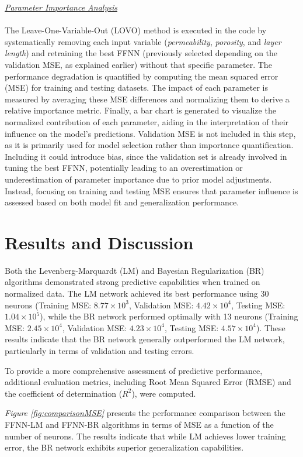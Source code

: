 \documentclass[10pt]{article}
\begin{document}
		\underline{\textit{Parameter Importance Analysis}} \\
		\\
		The Leave-One-Variable-Out (LOVO) method is executed in the code by systematically removing each input variable (\textit{permeability}, \textit{porosity}, and \textit{layer length}) and retraining the best FFNN (previously selected depending on the validation MSE, as explained earlier) without that specific parameter. The performance degradation is quantified by computing the mean squared error (MSE) for training and testing datasets. The impact of each parameter is measured by averaging these MSE differences and normalizing them to derive a relative importance metric. Finally, a bar chart is generated to visualize the normalized contribution of each parameter, aiding in the interpretation of their influence on the model's predictions. Validation MSE is not included in this step, as it is primarily used for model selection rather than importance quantification. Including it could introduce bias, since the validation set is already involved in tuning the best FFNN, potentially leading to an overestimation or underestimation of parameter importance due to prior model adjustments. Instead, focusing on training and testing MSE ensures that parameter influence is assessed based on both model fit and generalization performance.
	
	\section{Results and Discussion}
	
	Both the Levenberg-Marquardt (LM) and Bayesian Regularization (BR) algorithms demonstrated strong predictive capabilities when trained on normalized data. The LM network achieved its best performance using 30 neurons (Training MSE: \(8.77 \times 10^3\), Validation MSE: \(4.42 \times 10^4\), Testing MSE: \(1.04 \times 10^5\)), while the BR network performed optimally with 13 neurons (Training MSE: \(2.45 \times 10^4\), Validation MSE: \(4.23 \times 10^4\), Testing MSE: \(4.57 \times 10^4\)). These results indicate that the BR network generally outperformed the LM network, particularly in terms of validation and testing errors.
	
	To provide a more comprehensive assessment of predictive performance, additional evaluation metrics, including Root Mean Squared Error (RMSE) and the coefficient of determination ($R^2$), were computed.
	
	\textit{Figure \ref{fig:comparisonMSE}} presents the performance comparison between the FFNN-LM and FFNN-BR algorithms in terms of MSE as a function of the number of neurons. The results indicate that while LM achieves lower training error, the BR network exhibits superior generalization capabilities.
	
\end{document}
